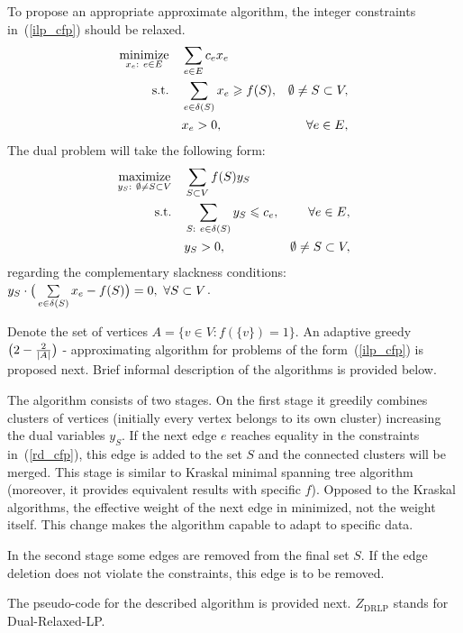 \documentclass[11pt, tightenlines, twoside, onecolumn, nofloats, nobibnotes, nofootinbib, superscriptaddress, noshowpacks, centertags]{revtex4}
\begin{document}
To propose an appropriate approximate algorithm, the integer constraints in~(\ref{ilp_cfp}) should be relaxed. 
\begin{align}
\underset{x_e:~e\in E}{\text{minimize}}\quad & \sum\limits_{e\in E}c_ex_e \nonumber\\
\text{s.t.\quad} & \sum\limits_{e\in \delta(S)}x_e\geqslant f(S), & \emptyset\not=S\subset V,
\label{rlp_cfp}\\
& x_e>0, &\forall e\in E,\nonumber
\end{align}
The dual problem will take the following form:
\begin{align}
\underset{y_S:~\emptyset\not=S\subset V}{\text{maximize}}\quad & \sum\limits_{S\subset V}f(S)y_S \nonumber\\
\text{s.t.\quad} & \sum\limits_{S:~e\in \delta(S)}y_S\leqslant c_e, & \forall e\in E,
\label{rd_cfp}\\
& y_S>0, &\emptyset\not=S\subset V,\nonumber
\end{align}
regarding the complementary slackness conditions: $y_S\cdot \big(\sum\limits_{e\in \delta(S)}x_e - f(S)\big) = 0,~\forall S\subset V$.

Denote the set of vertices $A=\{v\in V: f(\{v\})=1\}$. An adaptive greedy $\big(2-\frac{2}{|A|}\big)$ - approximating algorithm for problems of the form~(\ref{ilp_cfp}) is proposed next. Brief informal description of the algorithms is provided below.

The algorithm consists of two stages. On the first stage it greedily combines clusters of vertices (initially every vertex belongs to its own cluster) increasing the dual variables $y_S$. If the next edge $e$ reaches equality in the constraints in~(\ref{rd_cfp}), this edge is added to the set $S$ and the connected clusters will be merged. This stage is similar to Kraskal minimal spanning tree algorithm (moreover, it provides equivalent results with specific $f$). Opposed to the Kraskal algorithms, the effective weight of the next edge in minimized, not the weight itself. This change makes the algorithm capable to adapt to specific data. 

In the second stage some edges are removed from the final set $S$. If the edge deletion does not violate the constraints, this edge is to be removed.

The pseudo-code for the described algorithm is provided next. $Z_{\text{DRLP}}$ stands for Dual-Relaxed-LP.
\end{document}
